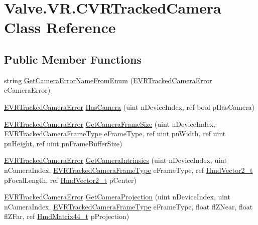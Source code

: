 \hypertarget{class_valve_1_1_v_r_1_1_c_v_r_tracked_camera}{}\section{Valve.\+V\+R.\+C\+V\+R\+Tracked\+Camera Class Reference}
\label{class_valve_1_1_v_r_1_1_c_v_r_tracked_camera}
\subsection*{Public Member Functions}
\begin{DoxyCompactItemize}
\item 
string \mbox{\hyperlink{class_valve_1_1_v_r_1_1_c_v_r_tracked_camera_aa39eb940b32bf3603c048bf01b720015}{Get\+Camera\+Error\+Name\+From\+Enum}} (\mbox{\hyperlink{namespace_valve_1_1_v_r_ad0e012e846f5d93848783c044614cfd3}{E\+V\+R\+Tracked\+Camera\+Error}} e\+Camera\+Error)
\item 
\mbox{\hyperlink{namespace_valve_1_1_v_r_ad0e012e846f5d93848783c044614cfd3}{E\+V\+R\+Tracked\+Camera\+Error}} \mbox{\hyperlink{class_valve_1_1_v_r_1_1_c_v_r_tracked_camera_acfbdc354ce7283a9b3059361037229ce}{Has\+Camera}} (uint n\+Device\+Index, ref bool p\+Has\+Camera)
\item 
\mbox{\hyperlink{namespace_valve_1_1_v_r_ad0e012e846f5d93848783c044614cfd3}{E\+V\+R\+Tracked\+Camera\+Error}} \mbox{\hyperlink{class_valve_1_1_v_r_1_1_c_v_r_tracked_camera_a6f5b1378d36c914562cb4edd80a8df65}{Get\+Camera\+Frame\+Size}} (uint n\+Device\+Index, \mbox{\hyperlink{namespace_valve_1_1_v_r_a9962211bc3fe98c2683db188c12c9afd}{E\+V\+R\+Tracked\+Camera\+Frame\+Type}} e\+Frame\+Type, ref uint pn\+Width, ref uint pn\+Height, ref uint pn\+Frame\+Buffer\+Size)
\item 
\mbox{\hyperlink{namespace_valve_1_1_v_r_ad0e012e846f5d93848783c044614cfd3}{E\+V\+R\+Tracked\+Camera\+Error}} \mbox{\hyperlink{class_valve_1_1_v_r_1_1_c_v_r_tracked_camera_a14c0112fec4074fee9eb035bd0341823}{Get\+Camera\+Intrinsics}} (uint n\+Device\+Index, uint n\+Camera\+Index, \mbox{\hyperlink{namespace_valve_1_1_v_r_a9962211bc3fe98c2683db188c12c9afd}{E\+V\+R\+Tracked\+Camera\+Frame\+Type}} e\+Frame\+Type, ref \mbox{\hyperlink{struct_valve_1_1_v_r_1_1_hmd_vector2__t}{Hmd\+Vector2\+\_\+t}} p\+Focal\+Length, ref \mbox{\hyperlink{struct_valve_1_1_v_r_1_1_hmd_vector2__t}{Hmd\+Vector2\+\_\+t}} p\+Center)
\item 
\mbox{\hyperlink{namespace_valve_1_1_v_r_ad0e012e846f5d93848783c044614cfd3}{E\+V\+R\+Tracked\+Camera\+Error}} \mbox{\hyperlink{class_valve_1_1_v_r_1_1_c_v_r_tracked_camera_af89b991a4c7e27dee9a0c01cc2bcd30f}{Get\+Camera\+Projection}} (uint n\+Device\+Index, uint n\+Camera\+Index, \mbox{\hyperlink{namespace_valve_1_1_v_r_a9962211bc3fe98c2683db188c12c9afd}{E\+V\+R\+Tracked\+Camera\+Frame\+Type}} e\+Frame\+Type, float fl\+Z\+Near, float fl\+Z\+Far, ref \mbox{\hyperlink{struct_valve_1_1_v_r_1_1_hmd_matrix44__t}{Hmd\+Matrix44\+\_\+t}} p\+Projection)

\end{DoxyCompactItemize}

